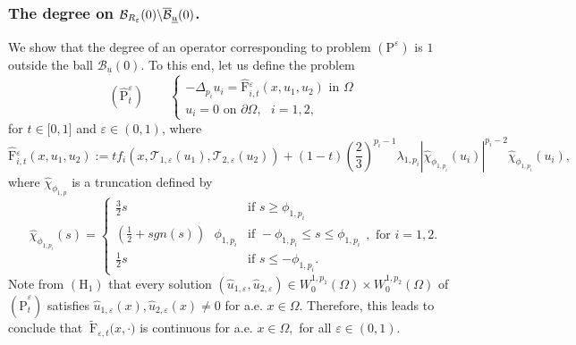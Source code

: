 \documentclass[11pt]{amsart}
\theoremstyle{definition}
\theoremstyle{remark}
\numberwithin{equation}{section}
\begin{document}
\subsubsection{\textbf{The degree on }$\mathcal{B}_{R_{\protect\varepsilon %
}}(0)\backslash \overline{\mathcal{B}}_{\protect\underline{u}}(0)$\textbf{.}}

We show that the degree of an operator corresponding to problem $(\mathrm{P}%
^{\varepsilon })$ is $1$ outside the ball $\mathcal{B}_{\underline{u}}(0)$.
To this end, let us define the problem%
\begin{equation*}
(\widehat{\mathrm{P}}_{t}^{\varepsilon })\qquad \left\{ 
\begin{array}{l}
-\Delta _{p_{i}}u_{i}=\widehat{\mathrm{F}}{_{i,t}^{\varepsilon }}({x,}%
u_{1},u_{2})\text{ in }\Omega \\ 
u_{i}=0\text{ \ on }\partial \Omega ,\text{ }i=1,2,%
\end{array}%
\right.
\end{equation*}%
for $t\in \lbrack 0,1]$ and $\varepsilon \in (0,1)$, where%
\begin{equation*}
\widehat{\mathrm{F}}{_{i,t}^{\varepsilon }}({x,}u_{1},u_{2}):=tf_{i}(x,%
\mathcal{T}_{1,\varepsilon }(u_{1}),\mathcal{T}_{2,\varepsilon
}(u_{2}))+(1-t)(\frac{2}{3})^{p_{i}-1}\lambda _{1,p_{i}}|\hat{\chi}_{\phi
_{1,p_{i}}}(u_{i})|^{p_{i}-2}\hat{\chi}_{\phi _{1,p_{i}}}(u_{i}),
\end{equation*}%
where $\hat{\chi}_{\phi _{1,p}}$ is a truncation defined by%
\begin{equation}
\hat{\chi}_{\phi _{1,p_{i}}}(s)=\left\{ 
\begin{array}{ll}
\frac{3}{2}s & \text{if }s\geq \phi _{1,p_{i}} \\ 
(\frac{1}{2}+sgn(s))\text{ }\phi _{1,p_{i}} & \text{if }-\phi _{1,p_{i}}\leq
s\leq \phi _{1,p_{i}} \\ 
\frac{1}{2}s & \text{if }s\leq -\phi _{1,p_{i}}.%
\end{array}%
\right. ,\text{ for }i=1,2.  \label{23}
\end{equation}%
Note from $(\mathrm{H}_{1})$ that every solution $(\hat{u}_{1,\varepsilon },%
\hat{u}_{2,\varepsilon })\in W_{0}^{1,p_{1}}(\Omega )\times
W_{0}^{1,p_{2}}(\Omega )$ of $(\widehat{\mathrm{P}}_{t}^{\varepsilon })$
satisfies $\hat{u}_{1,\varepsilon }(x),\hat{u}_{2,\varepsilon }(x)\neq 0$
for a.e. $x\in \Omega $. Therefore, this leads to conclude that $\mathrm{\ 
\tilde{F}}_{\varepsilon ,t}{(x},\cdot )$ is continuous for a.e. $x\in \Omega
,$ for all $\varepsilon \in (0,1)$.
\end{document}
